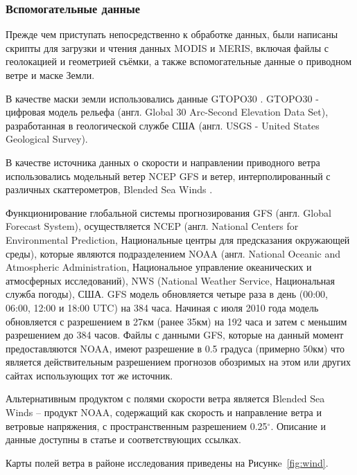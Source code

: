 \subsubsection{Вспомогательные данные}

Прежде чем приступать непосредственно к обработке данных, были написаны скрипты для загрузки и чтения данных MODIS и MERIS, включая файлы с геолокацией и геометрией съёмки, а также вспомогательные данные о приводном ветре и маске Земли.

В качестве маски земли использовались данные GTOPO30 \citep{USGS1996gtopo30}. GTOPO30 - цифровая модель рельефа (англ. Global 30 Arc-Second Elevation Data Set), разработанная в геологической службе США (англ. USGS - United States Geological Survey).

В качестве источника данных о скорости и направлении приводного ветра использовались модельный ветер NCEP GFS \citep{ncep} и ветер, интерполированный с различных скаттерометров, Blended Sea Winds \citep{Zhang2006}.

Функционирование глобальной системы прогнозирования GFS (англ. Global Forecast System), осуществляется NCEP (англ. National Centers for Environmental Prediction, Национальные центры для предсказания окружающей среды), которые являются подразделением NOAA (англ. National Oceanic and Atmospheric Administration, Национальное управление океанических и атмосферных исследований), NWS (National Weather Service, Национальная служба погоды), США. GFS модель обновляется четыре раза в день (00:00, 06:00, 12:00 и 18:00 UTC) на 384 часа. Начиная с июля 2010 года модель обновляется с разрешением в 27км (ранее 35км) на 192 часа и затем с меньшим разрешением до 384 часов. Файлы с данными GFS, которые на данный момент предоставляются NOAA, имеют разрешение в 0.5 градуса (примерно 50км) что является действительным разрешением прогнозов обозримых на этом или других сайтах использующих тот же источник.

Альтернативным продуктом с полями скорости ветра является Blended Sea Winds -- продукт NOAA, содержащий как скорость и направление ветра и ветровые напряжения, с пространственным разрешением 0.25${}^\circ$. Описание и данные доступны в статье \citep{Zhang2006} и соответствующих ссылках.

Карты полей ветра в районе исследования приведены на Рисункe~\ref{fig:wind}.



